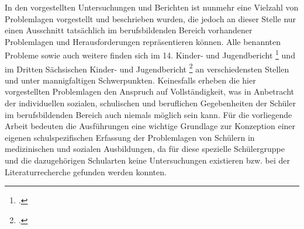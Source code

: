 In den vorgestellten Untersuchungen und Berichten ist nunmehr eine Vielzahl von Problemlagen vorgestellt und beschrieben wurden, die jedoch an dieser Stelle nur einen Ausschnitt tatsächlich im berufsbildenden Bereich vorhandener Problemlagen und Herausforderungen repräsentieren können. Alle benannten Probleme sowie auch weitere finden sich im 14. Kinder- und Jugendbericht \footcite[44f]{BundesministeriumFamilie2013} und im Dritten Sächsischen Kinder- und Jugendbericht \footcite[30ff]{SMSSS2009} an verschiedensten Stellen und unter mannigfaltigen Schwerpunkten. Keinesfalls erheben die hier vorgestellten Problemlagen den Anspruch auf Vollständigkeit, was in Anbetracht der individuellen sozialen, schulischen und beruflichen Gegebenheiten der Schüler im berufsbildenden Bereich auch niemals möglich sein kann. Für die vorliegende Arbeit bedeuten die Ausführungen eine wichtige Grundlage zur Konzeption einer eigenen schulspezifischen Erfassung der Problemlagen von Schülern in medizinischen und sozialen Ausbildungen, da für diese spezielle Schülergruppe und die dazugehörigen Schularten keine Untersuchungen existieren bzw. bei der Literaturrecherche gefunden werden konnten. 
